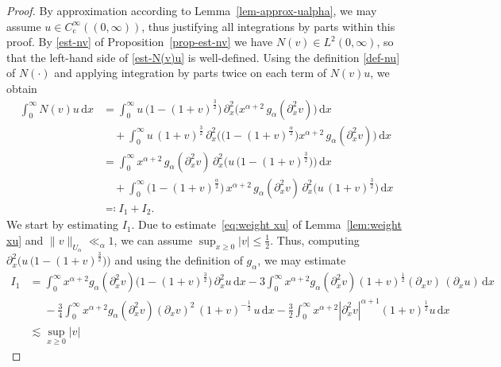 \documentclass[10pt,a4paper]{amsart}
\renewcommand{\d}{\ensuremath{\mathrm{d}}}
\begin{document}
\begin{proof}
By approximation according to Lemma~\ref{lem-approx-ualpha}, we may assume $u \in C^\infty_\mathrm{c}((0,\infty))$, thus justifying all integrations by parts within this proof. By \eqref{est-nv} of Proposition~\ref{prop-est-nv} we have $N(v) \in L^2(0,\infty)$, so that the left-hand side of \eqref{est-N(v)u} is well-defined. Using the definition \eqref{def-nu} of $N(\cdot)$ and applying integration by parts twice on each term of $N(v)u$, we obtain
%
\begin{align}\nonumber
    \int_0^{\infty} N(v) u\, \d x 
    &= 
    \int_0^{\infty} u\, \bigl(1-(1+v)^{\frac{3}{2}}\bigr) \, \partial^2_x\bigl(x^{\alpha+2}\, g_{\alpha}(\partial_x^2 v)\bigr) \, \d x 
    \\
    & \quad 
    + \int_0^{\infty} u\,  (1+v)^{\frac{3}{2}} \, \partial^2_x\bigl(
    \bigl(1-(1+v)^{\frac{\alpha}{2}}\bigr) x^{\alpha+2}\, g_{\alpha}(\partial_x^2 v)\bigr) \, \d x 
    \nonumber\\
    &= 
    \int_0^{\infty} x^{\alpha+2}\, g_{\alpha}(\partial_x^2 v)\, 
    \partial^2_x\bigl(u\, \bigl(1-(1+v)^{\frac{3}{2}}\bigr)\bigr) \, \d x 
    \nonumber\\
    &\quad 
    + \int_0^{\infty} \bigl(1-(1+v)^{\frac{\alpha}{2}}\bigr) \, x^{\alpha+2}\, g_{\alpha}(\partial_x^2 v)\, \partial^2_x\bigl(u\,  (1+v)^{\frac{3}{2}}\bigr) \,\d x
    \nonumber\\
    &\eqcolon
    I_1 + I_2. \label{eq:estimate1RHS}
\end{align}
%
We start by estimating $I_1$. Due to estimate~\eqref{eq:weight xu} of Lemma~\ref{lem:weight xu} and $\|v\|_{U_\alpha} \ll_\alpha 1$, we can assume $\sup_{x\geq 0} |v| \le \frac 1 2$. Thus, computing $\partial^2_x\bigl(u\, \bigl(1-(1+v)^{\frac{3}{2}}\bigr)\bigr)$ and using the definition of $g_\alpha$, we may estimate 
%
\begin{align}\nonumber
    I_1
    &=
    \int_0^\infty x^{\alpha+2} g_\alpha(\partial_x^2 v)  \bigl(1 - (1 + v)^\frac{3}{2}\bigr)\, \partial_x^2u\, \d x 
    - 
    3 \int_0^\infty x^{\alpha+2} g_\alpha(\partial_x^2 v) (1 + v)^\frac{1}{2} (\partial_x v)\, (\partial_x u)\, \d x
    \\
    & \phantom{=}
    - \frac{3}{4} \int_0^\infty x^{\alpha+2} g_\alpha(\partial_x^2 v) (\partial_x v)^2\, (1 + v)^{-\frac{1}{2}}\, u\,  \d x
    -
    \frac{3}{2} \int_0^\infty x^{\alpha+2} |\partial_x^2 v|^{\alpha+1} (1 + v)^\frac{1}{2} u\, \d x
    \nonumber\\
    & \lesssim
    \sup_{x\geq 0} |v|

\end{align}
\end{proof}
\end{document}
